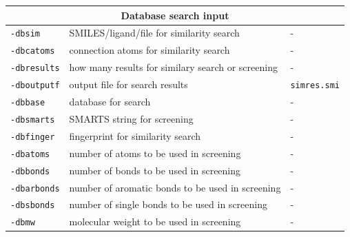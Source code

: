 \documentclass[a4paper,12pt]{assignment}
\begin{document}
\begin{tabular}{|l|l|l|}
\hline
\multicolumn{3}{|c|}{\Large \textbf{Database search input}}\\ \hline                        
\texttt{-dbsim} & SMILES/ligand/file for similarity search & - \\
\texttt{-dbcatoms} & connection atoms for similarity search & - \\
\texttt{-dbresults} & how many results for similary search or screening & - \\
\texttt{-dboutputf} & output file for search results & \texttt{simres.smi} \\
\texttt{-dbbase} & database for search & - \\
\texttt{-dbsmarts} & SMARTS string for screening & - \\
\texttt{-dbfinger} & fingerprint for similarity search & - \\
\texttt{-dbatoms} & number of atoms to be used in screening & - \\
\texttt{-dbbonds} & number of bonds to be used in screening & - \\
\texttt{-dbarbonds} & number of aromatic bonds to be used in screening & - \\
\texttt{-dbsbonds} & number of single bonds to be used in screening & - \\
\texttt{-dbmw} & molecular weight to be used in screening & - \\
\hline
\end{tabular}
\end{document}
